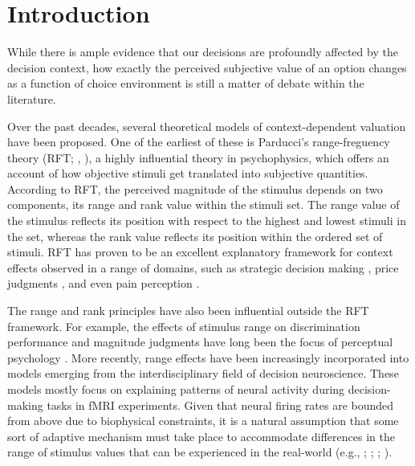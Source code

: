 \documentclass[11pt,a4paper]{article}
\begin{document}
	




\section{Introduction} \label{chap1intro}



While there is ample evidence that our decisions are profoundly affected by the decision context, how exactly the perceived subjective value of an option changes as a function of choice environment is still a matter of debate within the literature. 

Over the past decades, several theoretical models of context-dependent valuation have been proposed. One of the earliest of these is Parducci's range-freguency theory (RFT; , ), a highly influential theory in psychophysics, which offers an account of how objective stimuli get translated into subjective quantities. According to RFT, the perceived magnitude of the stimulus depends on two components, its range and rank value within the stimuli set. The range value of the stimulus reflects its position with respect to the highest and lowest stimuli in the set, whereas the rank value reflects its position within the ordered set of stimuli. RFT has proven to be an excellent explanatory framework for context effects observed in a range of domains, such as strategic decision making \cite{Vlaev2006a}, price judgments \cite{Niedrich2009}, and even pain perception \cite{Watkinson2013}.  


The range and rank principles have also been influential outside the RFT framework. For example, the effects of stimulus range on discrimination performance and magnitude judgments have long been the focus of perceptual psychology \cite{Lockhead1986}. More recently, range effects have been increasingly incorporated into models emerging from the interdisciplinary field of decision neuroscience. These models mostly focus on explaining patterns of neural activity during decision-making tasks in fMRI experiments. Given that neural firing rates are bounded from above due to biophysical constraints, it is a natural assumption that some sort of adaptive mechanism must take place to accommodate differences in the range of stimulus values that can be experienced in the real-world (e.g., ; ; ; ).

\end{document}
